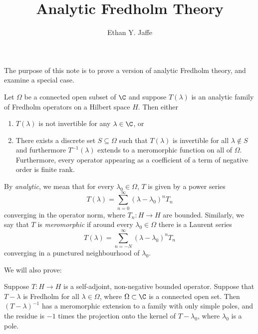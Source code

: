 \documentclass[12pt]{article}
\title{Analytic Fredholm Theory}
\author{Ethan Y. Jaffe}
\date{}
\begin{document}
\maketitle

\setcounter{section}{1}

The purpose of this note is to prove a version of analytic Fredholm theory, and examine a special case. 
\begin{thm}Let $\Omega$ be a connected open subset of $\C$ and suppose $T(\lambda)$ is an analytic family of Fredholm operators on a Hilbert space $H$. Then either
\begin{enumerate}[label = (\roman*)]
\item $T(\lambda)$ is not invertible for any $\lambda \in \C$, or
\item There exists a discrete set $S \subseteq \Omega$ such that $T(\lambda)$ is invertible for all $\lambda \not \in S$ and furthermore $T^{-1}(\lambda)$ extends to a meromorphic function on all of $\Omega$. Furthermore, every operator appearing as a coefficient of a term of negative order is finite rank.
\end{enumerate}
\end{thm}
By \emph{analytic}, we mean that for every $\lambda_0 \in \Omega$, $T$ is given by a power series
\[T(\lambda) = \sum_{n=0}^\infty (\lambda-\lambda_0)^nT_n\]
converging in the operator norm, where $T_n:H \to H$ are bounded. Similarly, we say that $T$ is \emph{meromorphic} if around every $\lambda_0 \in \Omega$ there is a Laurent series
\[T(\lambda) = \sum_{n=-N}^\infty (\lambda-\lambda_0)^nT_n\]
converging in a punctured neighbourhood of $\lambda_0$.

We will also prove:
\begin{prop}Suppose $T:H \to H$ is a self-adjoint, non-negative bounded operator. Suppose that $T-\lambda$ is Fredholm for all $\lambda \in \Omega$, where $\Omega \subset \C$ is a connected open set. Then $(T-\lambda)^{-1}$ has a meromorphic extension to a family with only simple poles, and the residue is $-1$ times the projection onto the kernel of $T-\lambda_0$, where $\lambda_0$ is a pole.\end{prop}
\end{document}

